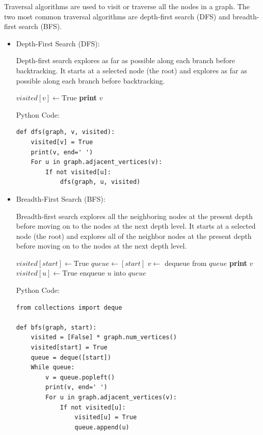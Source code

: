 \documentclass[12pt]{book} %
\begin{document}
Traversal algorithms are used to visit or traverse all the nodes in a graph. The two most common traversal algorithms are depth-first search (DFS) and breadth-first search (BFS).
\begin{itemize}
    \item Depth-First Search (DFS):

Depth-first search explores as far as possible along each branch before backtracking. It starts at a selected node (the root) and explores as far as possible along each branch before backtracking.
\FloatBarrier
\begin{algorithm}
\caption{Depth-first Search (DFS)}
\begin{algorithmic}[1]
    \State $visited[v] \gets \text{True}$
    \State \textbf{print} $v$
            \State {}
        \EndIf
    \EndFor
\EndFunction
\end{algorithmic}
\end{algorithm}
\FloatBarrier
Python Code:
\FloatBarrier

\begin{verbatim}
def dfs(graph, v, visited):
    visited[v] = True
    print(v, end=' ')
    For u in graph.adjacent_vertices(v):
        If not visited[u]:
            dfs(graph, u, visited)
\end{verbatim}
\FloatBarrier

\item Breadth-First Search (BFS):

Breadth-first search explores all the neighboring nodes at the present depth before moving on to the nodes at the next depth level. It starts at a selected node (the root) and explores all of the neighbor nodes at the present depth before moving on to the nodes at the next depth level.
\FloatBarrier %
\begin{algorithm}
\caption{Breadth-first Search (BFS)}
\begin{algorithmic}[1]
    \State $visited[start] \gets \text{True}$
    \State $queue \gets [start]$
        \State $v \gets$ dequeue from $queue$
        \State \textbf{print} $v$
                \State $visited[u] \gets \text{True}$
                \State enqueue $u$ into $queue$
            \EndIf
        \EndFor
    \EndWhile
\EndFunction
\end{algorithmic}
\end{algorithm}
\FloatBarrier
Python Code:
\FloatBarrier
\begin{verbatim}
from collections import deque

def bfs(graph, start):
    visited = [False] * graph.num_vertices()
    visited[start] = True
    queue = deque([start])
    While queue:
        v = queue.popleft()
        print(v, end=' ')
        For u in graph.adjacent_vertices(v):
            If not visited[u]:
                visited[u] = True
                queue.append(u)
\end{verbatim}
\end{itemize}
\end{document}
